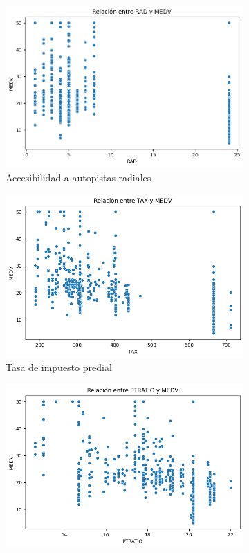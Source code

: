 \documentclass[12pt,a4paper]{article}
\begin{document}
\begin{figure}[H]
\begin{subfigure}[t]{0.24\textwidth}
    \centering
    \includegraphics[width=\textwidth]{images/rad_medv.png}
    \caption{\footnotesize Accesibilidad a autopistas radiales}
    \label{fig:modelo_rad}
\end{subfigure}
\hfill
\begin{subfigure}[t]{0.24\textwidth}
    \centering
    \includegraphics[width=\textwidth]{images/tax_medv.png}
    \caption{\footnotesize Tasa de impuesto predial}
    \label{fig:modelo_tax}
\end{subfigure}
\hfill
\begin{subfigure}[t]{0.24\textwidth}
    \centering
    \includegraphics[width=\textwidth]{images/ptratio_medv.png}

\end{subfigure}
\end{figure}
\end{document}
